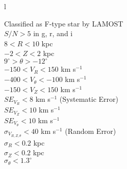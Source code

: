 \documentclass[11pt,preprint]{aastex6}
\begin{document}
\begin{deluxetable}{l}
\tabletypesize{\small}
\tablecaption{
	\label{tab:star_cuts}
}

\startdata
	Classified as F-type star by LAMOST\\
	$S/N > 5$ in g, r, and i\\
	$8 < R < 10$ kpc\\
	$-2 < Z < 2$ kpc\\
	$9^{\circ} > \theta > -12^{\circ}$\\
	$-150 < V_{R} < 150$ km s$^{-1}$\\
	$-400 < V_{\theta} < -100$ km s$^{-1}$\\
	$-150 < V_{Z} < 150$ km s$^{-1}$\\
	$SE_{V_{R}} < 8$ km s$^{-1}$ (Systematic Error)\\
	$SE_{V_{Z}} < 10$ km s$^{-1}$\\
	$SE_{V_{\theta}} < 10$ km s$^{-1}$\\
	$\sigma_{V_{R,Z,\theta}} < 40$ km s$^{-1}$ (Random Error)\\
	$\sigma_{R} < 0.2$ kpc\\
	$\sigma_{Z} < 0.2$ kpc\\
	$\sigma_{\theta} < 1.3^{\circ}$\\
\enddata
\end{deluxetable}
\end{document}
